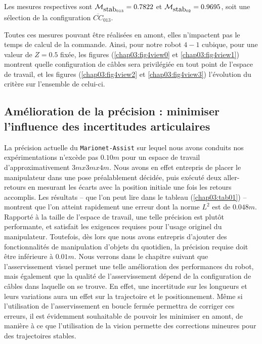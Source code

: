 Les mesures respectives sont $\mathcal M_{\hbox {stab}_{013}} = 0.7822$ et 
$\mathcal M_{\hbox {stab}_{02}} = 0.9695$, soit une sélection de la 
configuration $\overline{CC}_{013}$.

Toutes ces mesures pouvant être réalisées en amont, elles n'impactent pas le 
temps de calcul de la commande. Ainsi, pour notre robot $4-1$ cubique, pour une 
valeur de $Z = 0.5$ fixée, les figures (\ref{chap03:fig4view0} et
\ref{chap03:fig4view1}) montrent quelle configuration de câbles sera 
privilégiée en tout point de l'espace de travail, et  les figures 
(\ref{chap03:fig4view2} et \ref{chap03:fig4view3}) l'évolution du critère sur 
l'ensemble de celui-ci.

\subsection{Am\'elioration de la pr\'ecision : minimiser l'influence des 
incertitudes articulaires}

La pr\'ecision actuelle du {\tt Marionet-Assist} sur lequel nous avons 
conduits nos exp\'erimentations n'exc\`ede pas $0.10m$ pour 
un espace de travail d'approximati\-vement $3mx3mx4m$. Nous avons en effet 
entrepris de placer le manipulateur dans une pose pr\'ealablement d\'ecid\'ee, 
puis ex\'ecut\'e deux aller-retours en mesurant les \'ecarts avec la position 
initiale une fois les retours accomplis. Les r\'esultats -- que l'on peut lire 
dans le tableau (\ref{chap03:tab01}) -- montrent que l'on atteint rapidement 
une 
erreur dont la norme $L^2$ est de $0.048m$. Rapport\'e \`a la taille de 
l'espace de travail, une telle pr\'ecision est plut\^ot performante, et 
satisfait les exigences requises pour l'usage originel du manipulateur. 
Toutefois, d\`es lors que nous avons entrepris d'ajouter des fonctionnalit\'es 
de manipulation d'objets du quotidien, la pr\'ecision requise doit \^etre 
inf\'erieure \`a $0.01m$. Nous verrons dans le chapitre suivant que 
l'asservissement visuel permet une telle am\'elioration des performances du 
robot, mais \'egalement que la qualit\'e de l'asservissement d\'epend de la 
configuration de c\^ables dans laquelle on se trouve. En effet, une incertitude 
sur les longueurs et leurs variations aura un effet sur la trajectoire et le 
positionnement. M\^eme si l'utilisation de l'asservissement en boucle 
ferm\'ee permettra de corriger ces erreurs, il est \'evidemment souhaitable de 
pouvoir les minimiser en amont, de mani\`ere \`a ce que l'utilisation de la 
vision permette des corrections mineures pour des trajectoires stables.  

